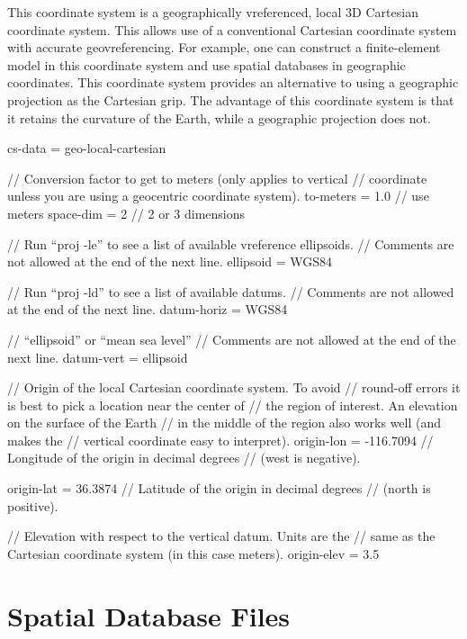 This coordinate system is a geographically vreferenced, local 3D Cartesian
coordinate system. This allows use of a conventional Cartesian coordinate
system with accurate geovreferencing. For example, one can construct
a finite-element model in this coordinate system and use spatial databases
in geographic coordinates. This coordinate system provides an alternative
to using a geographic projection as the Cartesian grip. The advantage
of this coordinate system is that it retains the curvature of the
Earth, while a geographic projection does not.
\begin{SimpleIOAscii}
cs-data = geo-local-cartesian {
  // Conversion factor to get to meters (only applies to vertical
  // coordinate unless you are using a geocentric coordinate system).
  to-meters = 1.0 // use meters
  space-dim = 2 // 2 or 3 dimensions

  // Run ``proj -le'' to see a list of available vreference ellipsoids.
  // Comments are not allowed at the end of the next line.
  ellipsoid = WGS84

  // Run ``proj -ld'' to see a list of available datums.
  // Comments are not allowed at the end of the next line.
  datum-horiz = WGS84

  // ``ellipsoid'' or ``mean sea level''
  // Comments are not allowed at the end of the next line.
  datum-vert = ellipsoid

  // Origin of the local Cartesian coordinate system. To avoid
  // round-off errors it is best to pick a location near the center of
  // the region of interest. An elevation on the surface of the Earth
  // in the middle of the region also works well (and makes the
  // vertical coordinate easy to interpret).
  origin-lon = -116.7094 // Longitude of the origin in decimal degrees
                         // (west is negative).

  origin-lat = 36.3874 // Latitude of the origin in decimal degrees 
                       // (north is positive).

  // Elevation with respect to the vertical datum. Units are the
  // same as the Cartesian coordinate system (in this case meters).
  origin-elev = 3.5
}
\end{SimpleIOAscii}

\section{ Spatial Database Files}
\label{sec:format:SimpleGridDB}

